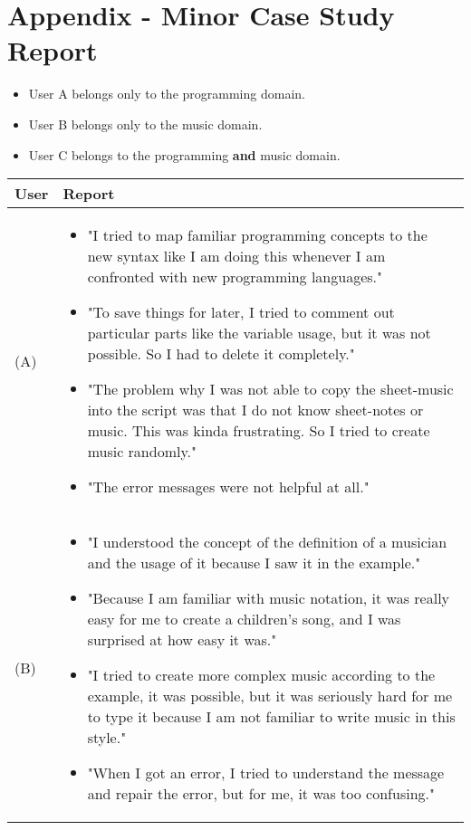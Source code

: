 \chapter{Appendix - Minor Case Study Report}
\label{APPENDIX_A}

\begin{itemize}
\item User A belongs only to the programming domain.
\item User B belongs only to the music domain.
\item User C belongs to the programming \textbf{and} music domain.
\end{itemize}

\begin{longtable}{p{50pt}|p{320pt}}
\rowcolor{htwg-teal} 
\textbf{User}		& \textbf{Report}     \\
\endhead
(A)                  		& \begin{itemize}
\item "I tried to map familiar programming concepts to the new syntax like I am doing this whenever I am confronted with new programming languages."
\item "To save things for later, I tried to comment out particular parts like the variable usage, but it was not possible. So I had to delete it completely."
\item "The problem why I was not able to copy the sheet-music into the script was that I do not know sheet-notes or music. This was kinda frustrating. So I tried to create music randomly."
\item "The error messages were not helpful at all."
\end{itemize} \\
(B)                 		& \begin{itemize}
\item "I understood the concept of the definition of a musician and the usage of it because I saw it in the example."
\item "Because I am familiar with music notation, it was really easy for me to create a children's song, and I was surprised at how easy it was."
\item "I tried to create more complex music according to the example, it was possible, but it was seriously hard for me to type it because I am not familiar to write music in this style."
\item "When I got an error, I tried to understand the message and repair the error, but for me, it was too confusing."
\end{itemize} \\

\end{longtable}
